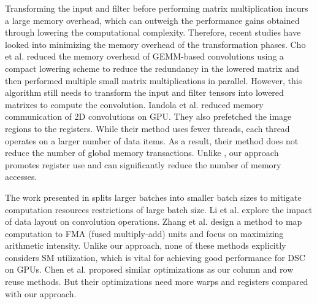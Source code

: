 Transforming the input and filter before performing matrix multiplication incurs a large memory overhead, which can outweigh the
performance gains obtained through lowering the computational complexity. Therefore, recent studies have looked into minimizing the memory
overhead of the transformation phases. Cho et al. \cite{cho2017mec} reduced the memory overhead of GEMM-based convolutions using a compact
lowering scheme to reduce the redundancy in the lowered matrix and then performed multiple small matrix multiplications in parallel.
However, this algorithm still needs to transform the input and filter tensors into lowered matrixes to compute the convolution. Iandola et
al. \cite{Iandola2014Communication} reduced memory communication of 2D convolutions on GPU. They also prefetched the image regions to the
registers. While their method uses fewer threads, each thread operates on a larger number of data items. As a result, their method does not
reduce the number of global memory transactions. Unlike \cite{Iandola2014Communication}, our approach promotes register use and can
significantly reduce the number of memory accesses.

The work presented in \cite{oyama2018accelerating} splits larger batches into smaller batch sizes to mitigate computation resources
restrictions of large batch size. Li et al. \cite{li2016optimizing} explore the impact of data layout on convolution operations. Zhang et
al. \cite{zhang2018high} design a method to map computation to FMA (fused multiply-add) units and focus on maximizing arithmetic intensity.
Unlike our approach, none of these methods explicitly considers SM utilization, which is vital for achieving good performance for DSC on GPUs. {\color{red}Chen et al. \cite{chen2019versatile} proposed similar optimizations as our column and row reuse methods. But their optimizations need more warps and registers compared with our approach.}
